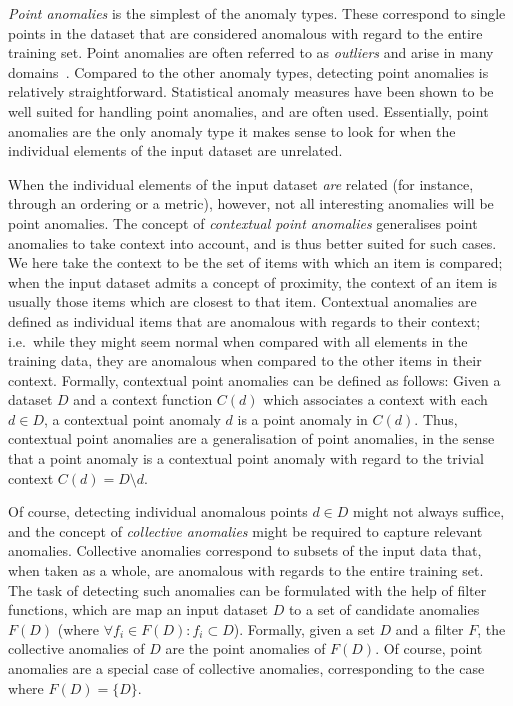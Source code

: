\emph{Point anomalies} is the simplest of the anomaly types. These correspond to single points in the dataset that are considered anomalous with regard to the entire training set. Point anomalies are often referred to as \emph{outliers} and arise in many domains~\cite{eskin}. Compared to the other anomaly types, detecting point anomalies is relatively straightforward. Statistical anomaly measures have been shown to be well suited for handling point anomalies, and are often used. Essentially, point anomalies are the only anomaly type it makes sense to look for when the individual elements of the input dataset are unrelated.

When the individual elements of the input dataset \emph{are} related (for instance, through an ordering or a metric), however, not all interesting anomalies will be point anomalies. The concept of \emph{contextual point anomalies} generalises point anomalies to take context into account, and is thus better suited for such cases. We here take the context to be the set of items with which an item is compared; when the input dataset admits a concept of proximity, the context of an item is usually those items which are closest to that item. Contextual anomalies are defined as individual items that are anomalous with regards to their context; i.e.\ while they might seem normal when compared with all elements in the training data, they are anomalous when compared to the other items in their context. Formally, contextual point anomalies can be defined as follows: Given a dataset $D$ and a context function $C(d)$ which associates a context with each $d \in D$, a contextual point anomaly $d$ is a point anomaly in $C(d)$. Thus, contextual point anomalies are a generalisation of point anomalies, in the sense that a point anomaly is a contextual point anomaly with regard to the trivial context $C(d) = D \setminus {d}$.

Of course, detecting individual anomalous points $d \in D$ might not always suffice, and the concept of \emph{collective anomalies} might be required to capture relevant anomalies. Collective anomalies correspond to subsets of the input data that, when taken as a whole, are anomalous with regards to the entire training set. The task of detecting such anomalies can be formulated with the help of filter functions, which are map an input dataset $D$ to a set of candidate anomalies $F(D)$ (where $\forall f_i \in F(D): f_i \subset D$). Formally, given a set $D$ and a filter $F$, the collective anomalies of $D$ are the point anomalies of $F(D)$. Of course, point anomalies are a special case of collective anomalies, corresponding to the case where $F(D) = \{D\}$.

